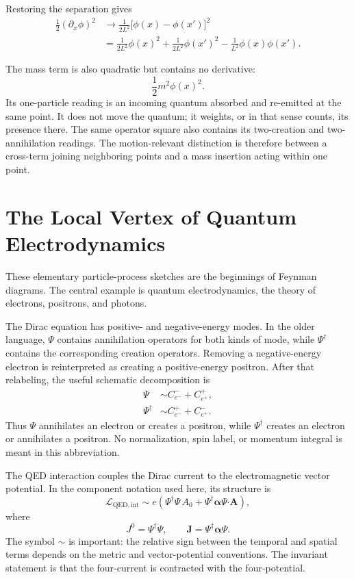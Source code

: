 Restoring the separation gives
\begin{align}
\frac12(\partial_x\phi)^2
&\longrightarrow
\frac{1}{2L^2}\bigl[\phi(x)-\phi(x')\bigr]^2
\\
&=
\frac{1}{2L^2}\phi(x)^2
+\frac{1}{2L^2}\phi(x')^2
-\frac{1}{L^2}\phi(x)\phi(x').
\end{align}

The mass term is also quadratic but contains no derivative:
\begin{equation}
\frac12m^2\phi(x)^2.
\end{equation}
Its one-particle reading is an incoming quantum absorbed and re-emitted at the same point. It does not move the quantum; it weights, or in that sense counts, its presence there. The same operator square also contains its two-creation and two-annihilation readings. The motion-relevant distinction is therefore between a cross-term joining neighboring points and a mass insertion acting within one point.

\section{The Local Vertex of Quantum Electrodynamics}

These elementary particle-process sketches are the beginnings of Feynman diagrams. The central example is quantum electrodynamics, the theory of electrons, positrons, and photons.

The Dirac equation has positive- and negative-energy modes. In the older language, \(\Psi\) contains annihilation operators for both kinds of mode, while \(\Psi^\dagger\) contains the corresponding creation operators. Removing a negative-energy electron is reinterpreted as creating a positive-energy positron. After that relabeling, the useful schematic decomposition is
\begin{align}
\Psi
&\sim
C^-_{e^-}+C^+_{e^+},
\\
\Psi^\dagger
&\sim
C^+_{e^-}+C^-_{e^+}.
\end{align}
Thus \(\Psi\) annihilates an electron or creates a positron, while \(\Psi^\dagger\) creates an electron or annihilates a positron. No normalization, spin label, or momentum integral is meant in this abbreviation.

The QED interaction couples the Dirac current to the electromagnetic vector potential. In the component notation used here, its structure is
\begin{equation}
\mathcal L_{\mathrm{QED,int}}
\sim
e\left(
\Psi^\dagger\Psi\,A_0
+
\Psi^\dagger\boldsymbol{\alpha}\Psi\mathbin{\boldsymbol{\cdot}}\mathbf A
\right),
\end{equation}
where
\begin{equation}
J^0=\Psi^\dagger\Psi,
\qquad
\mathbf J=\Psi^\dagger\boldsymbol{\alpha}\Psi.
\end{equation}
The symbol \(\sim\) is important: the relative sign between the temporal and spatial terms depends on the metric and vector-potential conventions. The invariant statement is that the four-current is contracted with the four-potential.

